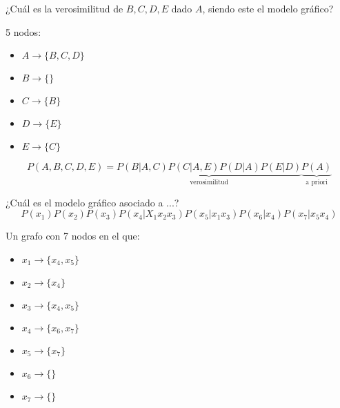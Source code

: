 \begin{problem}[1]

¿Cuál es la verosimilitud de $B,C,D,E$ dado $A$, siendo este el modelo gráfico?

5 nodos:
\begin{itemize}
	\item $A \to \{B,C,D\}$
	\item $B \to \{\} $
	\item $C \to \{B\} $
	\item $D \to \{E\} $
	\item $E \to \{C\} $
\end{itemize}



\solution

\[
P(A,B,C,D,E) = \underbrace{P(B|A,C) P(C|A,E) P (D|A)P(E|D)}_{\text{verosimilitud}}\underbrace{P(A)}_{\text{a priori}}
\]

\end{problem}

\begin{problem}
¿Cuál es el modelo gráfico asociado a ...?
\[P(x_1)P(x_2)P(x_3)P(x_4|X_1x_2x_3) P(x_5|x_1x_3) P(x_6 | x_4) P (x_7 | x_5x_4)\]

\solution

Un grafo con 7 nodos en el que:

\begin{itemize}
	\item $x_1 \to \{x_4,x_5\}$
	\item $x_2 \to \{x_4\}$
	\item $x_3 \to \{x_4,x_5\}$
	\item $x_4 \to \{x_6,x_7\}$
	\item $x_5 \to \{x_7\}$
	\item $x_6 \to \{ \}$
	\item $x_7 \to \{ \}$
\end{itemize}

\end{problem}


